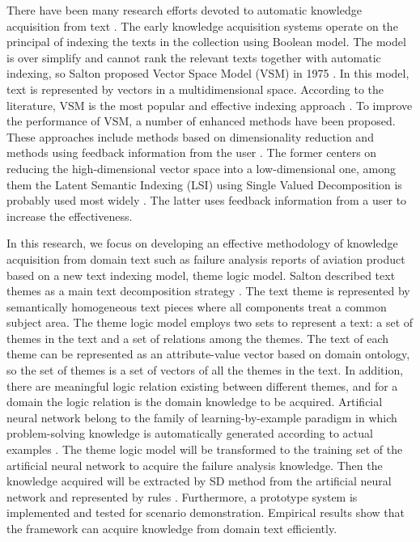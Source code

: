 \documentclass{elsarticle}
\begin{document}
There have been many research efforts devoted to automatic knowledge
acquisition from text \cite{salton1975vsm,361220,215383,Tai2002,130346} . The early
knowledge acquisition systems operate on the principal of indexing the
texts in the collection using Boolean model. The model is over
simplify and cannot rank the relevant texts together with automatic
indexing, so Salton proposed Vector Space Model (VSM) in 1975 \cite{salton1975vsm,361220}. In this model, text is represented by vectors in a multidimensional space. According to the literature, VSM is the most popular and effective indexing approach \cite{215383}. To improve the performance of VSM, a number of enhanced methods have been proposed. These approaches include methods based on dimensionality reduction and methods using feedback information from the user \cite{Tai2002}. The former centers on reducing the high-dimensional vector space into a low-dimensional one, among them the Latent Semantic Indexing (LSI) using Single Valued Decomposition is probably used most widely \cite{130346}. The latter uses feedback information from a user to increase the effectiveness.

In this research, we focus on developing an effective methodology of knowledge acquisition from domain text such as failure analysis reports of aviation product based on a new text indexing model, theme logic model. Salton described text themes as a main text decomposition strategy \cite{234834}. The text theme is represented by semantically homogeneous text pieces where all components treat a common subject area. The theme logic model employs two sets to represent a text: a set of themes in the text and a set of relations among the themes. The text of each theme can be represented as an attribute-value vector based on domain ontology, so the set of themes is a set of vectors of all the themes in the text. In addition, there are meaningful logic relation existing between different themes, and for a domain the logic relation is the domain knowledge to be acquired. Artificial neural network belong to the family of learning-by-example paradigm in which problem-solving knowledge is automatically generated according to actual examples \cite{Huang2002,Kim2004}. The theme logic model will be transformed to the training set of the artificial neural network to acquire the failure analysis knowledge. Then the knowledge acquired will be extracted by SD method from the artificial neural network and represented by rules \cite{130346,Sestito1991}. Furthermore, a prototype system is implemented and tested for scenario demonstration. Empirical results show that the framework can acquire knowledge from domain text efficiently.
\end{document}

